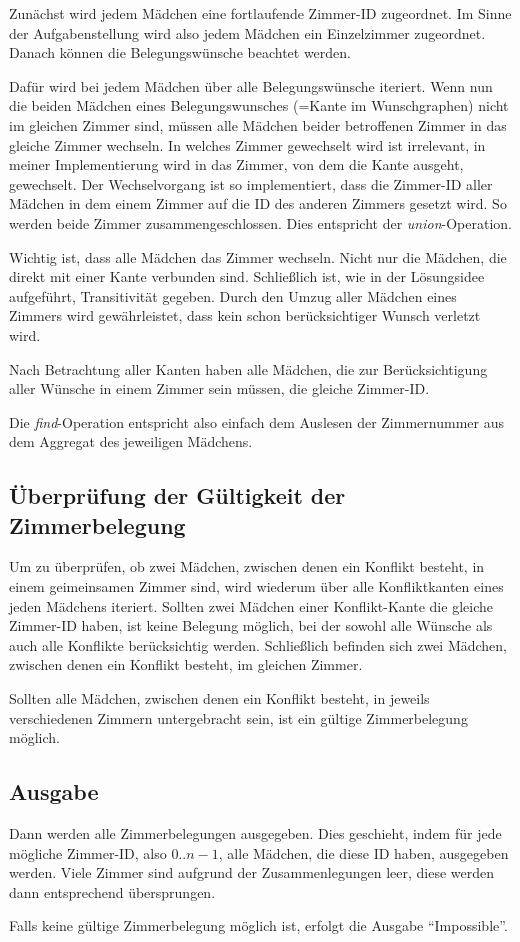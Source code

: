 Zunächst wird jedem Mädchen eine fortlaufende Zimmer-ID zugeordnet.
Im Sinne der Aufgabenstellung wird also jedem Mädchen ein Einzelzimmer zugeordnet.
Danach können die Belegungswünsche beachtet werden.

Dafür wird bei jedem Mädchen über alle Belegungswünsche iteriert.
Wenn nun die beiden Mädchen eines Belegungswunsches (=Kante im Wunschgraphen)
nicht im gleichen Zimmer sind, müssen alle Mädchen beider betroffenen Zimmer in das
gleiche Zimmer wechseln.
In welches Zimmer gewechselt wird ist irrelevant, in meiner Implementierung wird in das
Zimmer, von dem die Kante ausgeht, gewechselt.
Der Wechselvorgang ist so implementiert, dass die Zimmer-ID aller Mädchen in dem einem
Zimmer auf die ID des anderen Zimmers gesetzt wird. So werden beide Zimmer
zusammengeschlossen. Dies entspricht der \textit{union}-Operation.

Wichtig ist, dass alle Mädchen das Zimmer wechseln. Nicht nur die Mädchen,
die direkt mit einer Kante verbunden sind.
Schließlich ist, wie in der Lösungsidee aufgeführt, Transitivität gegeben.
Durch den Umzug aller Mädchen eines Zimmers wird gewährleistet,
dass kein schon berücksichtiger Wunsch verletzt wird.

Nach Betrachtung aller Kanten haben alle Mädchen,
die zur Berücksichtigung aller Wünsche in einem Zimmer sein müssen,
die gleiche Zimmer-ID.

Die \textit{find}-Operation entspricht also einfach dem Auslesen der Zimmernummer aus dem Aggregat des jeweiligen Mädchens.

\subsection{Überprüfung der Gültigkeit der Zimmerbelegung}
Um zu überprüfen, ob zwei Mädchen, zwischen denen ein Konflikt besteht,
in einem geimeinsamen Zimmer sind,
wird wiederum über alle Konfliktkanten eines jeden Mädchens iteriert.
Sollten zwei Mädchen einer Konflikt-Kante die gleiche Zimmer-ID haben, ist keine Belegung möglich, bei der sowohl alle Wünsche als auch alle Konflikte berücksichtig werden.
Schließlich befinden sich zwei Mädchen, zwischen denen ein Konflikt besteht, im gleichen
Zimmer.

Sollten alle Mädchen, zwischen denen ein Konflikt besteht, in jeweils verschiedenen Zimmern untergebracht sein, ist ein gültige Zimmerbelegung möglich.

\subsection{Ausgabe}
Dann werden alle Zimmerbelegungen ausgegeben.
Dies geschieht, indem für jede mögliche Zimmer-ID, also \(0 .. n-1\),
alle Mädchen, die diese ID haben, ausgegeben werden.
Viele Zimmer sind aufgrund der Zusammenlegungen leer,
diese werden dann entsprechend übersprungen.

Falls keine gültige Zimmerbelegung möglich ist, erfolgt die Ausgabe "`Impossible"'.

